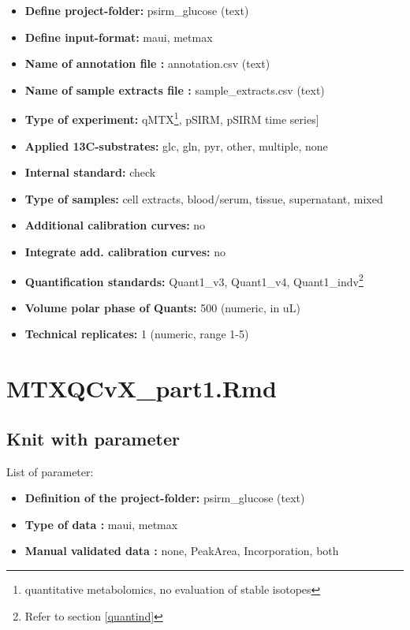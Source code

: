 \documentclass[]{book}
\providecommand{\tightlist}{%
  \setlength{\itemsep}{0pt}\setlength{\parskip}{0pt}}
\let\rmarkdownfootnote\footnote%
\def\footnote{\protect\rmarkdownfootnote}
\begin{document}
\begin{itemize}
\tightlist
\item
  \textbf{Define project-folder:} psirm\_glucose (text)
\item
  \textbf{Define input-format:} maui, metmax
\item
  \textbf{Name of annotation file :} annotation.csv (text)
\item
  \textbf{Name of sample extracts file :} sample\_extracts.csv (text)
\item
  \textbf{Type of experiment:} qMTX\footnote{quantitative metabolomics, no evaluation of stable isotopes}, pSIRM, pSIRM time series{]}
\item
  \textbf{Applied 13C-substrates:} glc, gln, pyr, other, multiple, none
\item
  \textbf{Internal standard:} check
\item
  \textbf{Type of samples:} cell extracts, blood/serum, tissue, supernatant, mixed
\item
  \textbf{Additional calibration curves:} no
\item
  \textbf{Integrate add. calibration curves:} no
\item
  \textbf{Quantification standards:} Quant1\_v3, Quant1\_v4, Quant1\_indv\footnote{Refer to section \ref{quantind}}
\item
  \textbf{Volume polar phase of Quants:} 500 (numeric, in uL)
\item
  \textbf{Technical replicates:} 1 (numeric, range 1-5)
\end{itemize}

\hypertarget{part1}{%
\chapter{MTXQCvX\_part1.Rmd}\label{part1}}

\hypertarget{knit-with-parameter-2}{%
\section{Knit with parameter}\label{knit-with-parameter-2}}

List of parameter:

\begin{itemize}
\tightlist
\item
  \textbf{Definition of the project-folder:} psirm\_glucose (text)
\item
  \textbf{Type of data :} maui, metmax
\item
  \textbf{Manual validated data :} none, PeakArea, Incorporation, both
\end{itemize}
\end{document}
